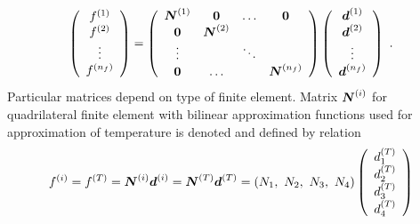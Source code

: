 \documentclass[12pt]{book}
\newcommand{\mbf}[1]{\mbox{\boldmath$#1$}}
\begin{document}
\begin{equation}\label{defapproxmat}
\left(\begin{array}{c}
f^{(1)}
\\
f^{(2)}
\\
\vdots
\\
f^{(n_f)}
\end{array}\right)
=
\left(\begin{array}{cccc}
\mbf{N}^{(1)} & \mbf{0}       & \ldots & \mbf{0}
\\
\mbf{0}       & \mbf{N}^{(2)} &        &
\\
\vdots        &               & \ddots &
\\
\mbf{0}       & \ldots        &        & \mbf{N}^{(n_f)}
\\
\end{array}\right)
\left(\begin{array}{c}
\mbf{d}^{(1)}
\\
\mbf{d}^{(2)}
\\
\vdots
\\
\mbf{d}^{(n_f)}
\end{array}\right)\ .
\end{equation}
Particular matrices depend on type of finite element. Matrix $\mbf{N}^{(i)}$ for quadrilateral finite
element with bilinear approximation functions used for approximation of temperature is denoted and defined
by relation
\begin{equation}
f^{(i)} = f^{(T)} = \mbf{N}^{(i)} \mbf{d}^{(i)} = \mbf{N}^{(T)} \mbf{d}^{(T)} = (N_1,\ N_2,\ N_3,\ N_4)
\left(\begin{array}{c}
d_1^{(T)}
\\
d_2^{(T)}
\\
d_3^{(T)}
\\
d_4^{(T)}
\end{array}\right)
\end{equation}
\end{document}
